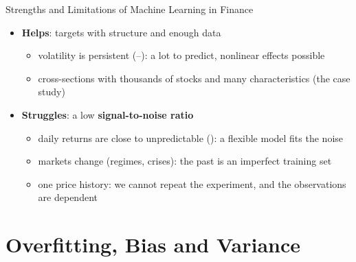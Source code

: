 \begin{frame}{Strengths and Limitations of Machine Learning in Finance}
\itemsize{\small}
\begin{itemize}
    \item \textbf{Helps}: targets with structure and enough data
    \begin{itemize}
        \item volatility is persistent (--): a lot to predict, nonlinear effects possible
        \item cross-sections with thousands of stocks and many characteristics (the case study)
    \end{itemize}
    \item \textbf{Struggles}: a low \textbf{signal-to-noise ratio}
    \begin{itemize}
        \item daily returns are close to unpredictable (): a flexible model fits the noise
        \item markets change (regimes, crises): the past is an imperfect training set
        \item one price history: we cannot repeat the experiment, and the observations are dependent
    \end{itemize}
\end{itemize}
\end{frame}


\section{Overfitting, Bias and Variance}

